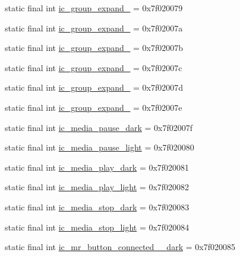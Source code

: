 \begin{CompactItemize}
static final int \hyperlink{classandroid_1_1support_1_1v7_1_1mediarouter_1_1_r_1_1drawable_b0f9625464e28ed481da2b9bd6b57ca2}{ic\_\-group\_\-expand\_} = 0x7f020079
\item 
static final int \hyperlink{classandroid_1_1support_1_1v7_1_1mediarouter_1_1_r_1_1drawable_3609733419124b0deb03a3eb0a3b932c}{ic\_\-group\_\-expand\_} = 0x7f02007a
\item 
static final int \hyperlink{classandroid_1_1support_1_1v7_1_1mediarouter_1_1_r_1_1drawable_1f1770fb5e4e0e3a578d487c9b12af03}{ic\_\-group\_\-expand\_} = 0x7f02007b
\item 
static final int \hyperlink{classandroid_1_1support_1_1v7_1_1mediarouter_1_1_r_1_1drawable_2bbe189842994be47cb6fde6f31a6212}{ic\_\-group\_\-expand\_} = 0x7f02007c
\item 
static final int \hyperlink{classandroid_1_1support_1_1v7_1_1mediarouter_1_1_r_1_1drawable_f8b3a62da11ce348884da974ad9c1e01}{ic\_\-group\_\-expand\_} = 0x7f02007d
\item 
static final int \hyperlink{classandroid_1_1support_1_1v7_1_1mediarouter_1_1_r_1_1drawable_8e82adc5abba683bf61a2ced5c8cf002}{ic\_\-group\_\-expand\_} = 0x7f02007e
\item 
static final int \hyperlink{classandroid_1_1support_1_1v7_1_1mediarouter_1_1_r_1_1drawable_ba776a9c4e947377244f425ce5376e2c}{ic\_\-media\_\-pause\_\-dark} = 0x7f02007f
\item 
static final int \hyperlink{classandroid_1_1support_1_1v7_1_1mediarouter_1_1_r_1_1drawable_4319b433c360d670ec100ae3a9d11c12}{ic\_\-media\_\-pause\_\-light} = 0x7f020080
\item 
static final int \hyperlink{classandroid_1_1support_1_1v7_1_1mediarouter_1_1_r_1_1drawable_e76f985e0d0500f4de210dd91fec859f}{ic\_\-media\_\-play\_\-dark} = 0x7f020081
\item 
static final int \hyperlink{classandroid_1_1support_1_1v7_1_1mediarouter_1_1_r_1_1drawable_168a95b75ff924d05dff5745f79ab8c1}{ic\_\-media\_\-play\_\-light} = 0x7f020082
\item 
static final int \hyperlink{classandroid_1_1support_1_1v7_1_1mediarouter_1_1_r_1_1drawable_9a4ee7571435a1c091ac2b2b9370857b}{ic\_\-media\_\-stop\_\-dark} = 0x7f020083
\item 
static final int \hyperlink{classandroid_1_1support_1_1v7_1_1mediarouter_1_1_r_1_1drawable_3f63c4aba68af98601850a88310d5186}{ic\_\-media\_\-stop\_\-light} = 0x7f020084
\item 
static final int \hyperlink{classandroid_1_1support_1_1v7_1_1mediarouter_1_1_r_1_1drawable_aa2fe622893d4d82d24873886b42d8ec}{ic\_\-mr\_\-button\_\-connected\_\_\-dark} = 0x7f020085

\end{CompactItemize}
